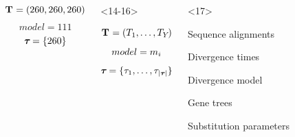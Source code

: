 \begin{frame}
\begin{columns}[c]
\begin{onlyenv}
\begin{minipage}[c][0.5\textheight][c]{\linewidth}
\begin{displaybox}[0.95\linewidth]
\begin{minipage}[c][0.45\textheight][c]{0.95\linewidth}
\[                            \mathbf{T_{}} = (260,260,260)
                        \]\vspace{0mm}
                        \[
                            model = 111
                        \]\vspace{0mm}
                        \[
                            \boldsymbol{\tau_{}} = \{260\}
                        \]\vspace{0mm}
                    \end{minipage}
                \end{displaybox}
            \end{minipage}
        \end{onlyenv}
        \begin{onlyenv}<14-16>
            \begin{minipage}[c][0.5\textheight][c]{\linewidth}
                \begin{displaybox}[0.95\linewidth]
                    \begin{minipage}[c][0.45\textheight][c]{0.95\linewidth}
                        \[
                            \mathbf{T_{}} = (T_{1},\ldots,T_{Y_{}})
                        \]\vspace{0mm}
                        \[
                            model = m_{i}
                        \]\vspace{0mm}
                        \[
                            \boldsymbol{\tau_{}} = \{\tau_{1},\ldots,\tau_{\lvert \boldsymbol{\tau_{}} \rvert}\}
                        \]\vspace{0mm}
                    \end{minipage}
                \end{displaybox}
            \end{minipage}
        \end{onlyenv}
        \begin{onlyenv}<17>
            \begin{minipage}[c][0.5\textheight][c]{\linewidth}
                \begin{mydescription}
                    \item[\alignmentVector] Sequence alignments
                    \item[\divTimeMapVector] Divergence times
                    \item[\divModel{}] Divergence model
                    \item[\geneTreeVector] Gene trees
                    \item[\hkyModelVector] Substitution parameters

\end{mydescription}
\end{minipage}
\end{onlyenv}
\end{columns}
\end{frame}
